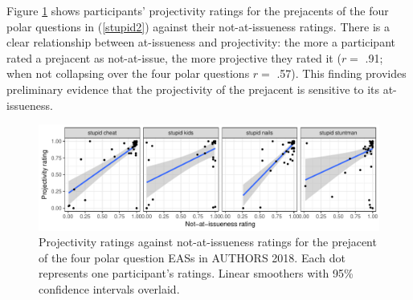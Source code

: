 \documentclass[11pt,fleqn]{article}
\newcommand{\6}{\mbox{$[\hspace*{-.6mm}[$}}
\newcommand{\9}{\mbox{$]\hspace*{-.6mm}]$}}
\begin{document}
Figure \ref{f-corr} shows participants' projectivity ratings for the prejacents of the four polar questions in (\ref{stupid2}) against their not-at-issueness ratings. There is a clear relationship between at-issueness and projectivity: the more a participant rated a prejacent as not-at-issue, the more projective they rated it ($r =$ .91; when not collapsing over the four polar questions $r =$ .57). This finding provides preliminary evidence that the projectivity of the prejacent is sensitive to its at-issueness.

\begin{figure}[h!]
\centering

\includegraphics[width=1\textwidth]{figures/Exp1a-subject-projai-stupid}

\caption{Projectivity ratings against not-at-issueness ratings for the prejacent of the four polar question EASs in AUTHORS 2018. Each dot represents one participant's ratings. Linear smoothers with 95\% confidence intervals overlaid.}
\label{f-corr}
\end{figure}
\end{document}
